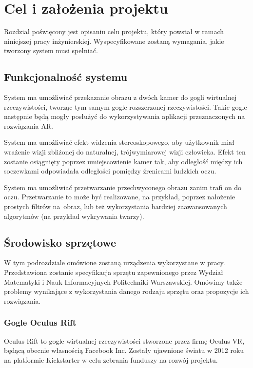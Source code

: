 \documentclass[a4paper,11pt,twoside]{report}
\theoremstyle{definition}
\begin{document}
\chapter{Cel i założenia projektu} %

Rozdział poświęcony jest opisaniu celu projektu, który powstał w ramach niniejszej pracy inżynierskiej. Wyspecyfikowane zostaną wymagania, jakie tworzony system musi spełniać.

\section{Funkcjonalność systemu}
System ma umożliwiać przekazanie obrazu z dwóch kamer do gogli wirtualnej rzeczywistości, tworząc tym samym gogle rozszerzonej rzeczywistości. Takie gogle następnie będą mogły posłużyć do wykorzystywania aplikacji przeznaczonych na rozwiązania AR. 

System ma umożliwiać efekt widzenia stereoskopowego, aby użytkownik miał wrażenie wizji zbliżonej do naturalnej, trójwymiarowej wizji człowieka. Efekt ten zostanie osiągnięty poprzez umiejscowienie kamer tak, aby odległość między ich soczewkami odpowiadała odległości pomiędzy źrenicami ludzkich oczu. 

System ma umożliwiać przetwarzanie przechwyconego obrazu zanim trafi on do oczu. Przetwarzanie to może być realizowane, na przykład, poprzez nałożenie prostych filtrów na~obraz, lub też wykorzystania bardziej zaawansowanych algorytmów (na przykład wykrywania twarzy).

\section{Środowisko sprzętowe}
W tym podrozdziale omówione zostaną urządzenia wykorzystane w pracy. Przedstawiona zostanie specyfikacja sprzętu zapewnionego przez Wydział Matematyki i Nauk Informacyjnych Politechniki Warszawskiej. Omówimy także problemy wynikające z wykorzystania danego rodzaju sprzętu oraz propozycje ich rozwiązania.

\subsection{Gogle Oculus Rift}
Oculus Rift to gogle wirtualnej rzeczywistości stworzone przez firmę Oculus VR, będącą obecnie własnością Facebook Inc. Zostały ujawnione światu w 2012 roku na platformie Kickstarter w celu zebrania funduszy na rozwój projektu. 
\end{document}
